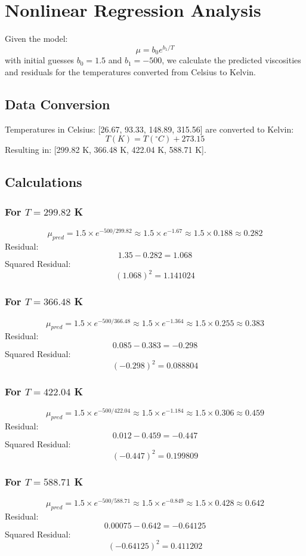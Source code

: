 \documentclass{article}
\begin{document}
\section*{Nonlinear Regression Analysis}

Given the model:
\[
\mu = b_0 e^{b_1 / T}
\]
with initial guesses \(b_0 = 1.5\) and \(b_1 = -500\), we calculate the predicted viscosities and residuals for the temperatures converted from Celsius to Kelvin.

\subsection*{Data Conversion}
Temperatures in Celsius: [26.67, 93.33, 148.89, 315.56] are converted to Kelvin:
\[
T(K) = T(^\circ C) + 273.15
\]
Resulting in: [299.82 K, 366.48 K, 422.04 K, 588.71 K].

\subsection*{Calculations}
\subsubsection*{For \(T = 299.82\) K}
\[
\mu_{pred} = 1.5 \times e^{-500 / 299.82} \approx 1.5 \times e^{-1.67} \approx 1.5 \times 0.188 \approx 0.282
\]
Residual:
\[
1.35 - 0.282 = 1.068
\]
Squared Residual:
\[
(1.068)^2 = 1.141024
\]

\subsubsection*{For \(T = 366.48\) K}
\[
\mu_{pred} = 1.5 \times e^{-500 / 366.48} \approx 1.5 \times e^{-1.364} \approx 1.5 \times 0.255 \approx 0.383
\]
Residual:
\[
0.085 - 0.383 = -0.298
\]
Squared Residual:
\[
(-0.298)^2 = 0.088804
\]

\subsubsection*{For \(T = 422.04\) K}
\[
\mu_{pred} = 1.5 \times e^{-500 / 422.04} \approx 1.5 \times e^{-1.184} \approx 1.5 \times 0.306 \approx 0.459
\]
Residual:
\[
0.012 - 0.459 = -0.447
\]
Squared Residual:
\[
(-0.447)^2 = 0.199809
\]

\subsubsection*{For \(T = 588.71\) K}
\[
\mu_{pred} = 1.5 \times e^{-500 / 588.71} \approx 1.5 \times e^{-0.849} \approx 1.5 \times 0.428 \approx 0.642
\]
Residual:
\[
0.00075 - 0.642 = -0.64125
\]
Squared Residual:
\[
(-0.64125)^2 = 0.411202
\]
\end{document}
